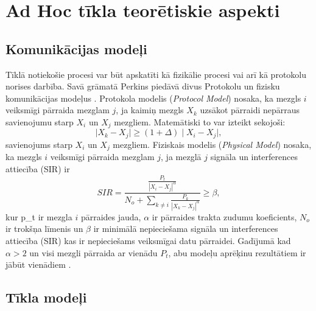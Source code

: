 \chapter{Ad Hoc tīkla teorētiskie aspekti}\label{sec:tris}

\section{Komunikācijas modeļi}
Tīklā notiekošie procesi var būt apskatīti kā fizikālie procesi vai arī kā protokolu norises darbība. Savā grāmatā Perkins piedāvā divus Protokolu un fizisku komunikācijas modeļus \cite{perkinsBook}. Protokola modelis (\textit{Protocol Model}) nosaka, ka mezgls $i$ veiksmīgi pārraida mezglam $j$, ja kaimiņ mezgls $X_{k}$ uzsākot pārraidi nepārraus savienojumu starp $X_{i}$ un $X_{j}$ mezgliem. Matemātiski to var izteikt sekojoši:
\begin{equation}
 \mid X_{k}-X_{j}\mid\geq(1+\Delta)\mid X_{i}-X_{j}\mid ,
\end{equation}
savienojums starp $X_{i}$ un $X_{j}$ mezgliem.
Fiziskais  modelis (\textit{Physical Model}) nosaka, ka mezgls $i$ veiksmīgi pārraida mezglam $j$, ja mezglā $j$ signāla un interferences attiecība (\acs{SIR}) ir
\begin{equation}
 SIR=\frac{\frac{P_{t}}{|X_{i} -X_{j}|^\alpha}}{N_{o}+\sum\limits_{k\neq i}\frac{P_{k}}{|X_{k}-X_{j}|^\alpha}}\geq\beta ,
\end{equation}
kur \gls{p_t} ir mezgla $i$ pārraides jauda, $\alpha$ ir pārraides trakta zudumu koeficients, $N_{o}$ ir trokšņa līmenis un $\beta$ ir minimālā nepieciešama signāla un interferences attiecība (\acs{SIR}) kas ir nepieciešams veiksmīgai datu pārraidei.  Gadījumā kad $\alpha >2$ un visi mezgli pārraida ar vienādu $P_{t}$, abu modeļu aprēķinu rezultātiem ir jābūt vienādiem \cite{perkinsBook}.


\section{Tīkla modeļi}
